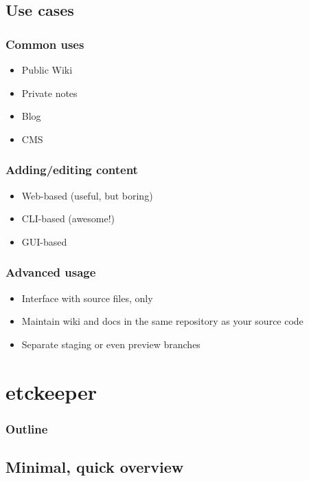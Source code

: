 \documentclass[t]{beamer}
\begin{document}
\subsection{Use cases}

\begin{frame}
	\frametitle{Common uses}
	\begin{itemize}
		\item Public Wiki
		\item Private notes
		\item Blog
		\item CMS
	\end{itemize}
\end{frame}

\begin{frame}
	\frametitle{Adding/editing content}
	\begin{itemize}
		\item Web-based (useful, but boring)
		\item CLI-based (awesome!)
		\item GUI-based
	\end{itemize}
\end{frame}

\begin{frame}
	\frametitle{Advanced usage}
	\begin{itemize}
		\item Interface with source files, only
		\item Maintain wiki and docs in the same repository as your source code
		\item Separate staging or even preview branches
	\end{itemize}
\end{frame}


\section{etckeeper}

\begin{frame}
	\frametitle{Outline}
	\tableofcontents[currentsection]
\end{frame}

\subsection{Minimal, quick overview}
\end{document}
